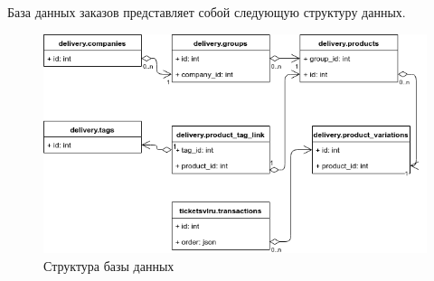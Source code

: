 База данных заказов представляет собой следующую структуру данных.
\begin{figure}[H]
    \centering
    \includegraphics[scale=0.6]{images/database.png}
    \caption{Структура базы данных}
\end{figure}
